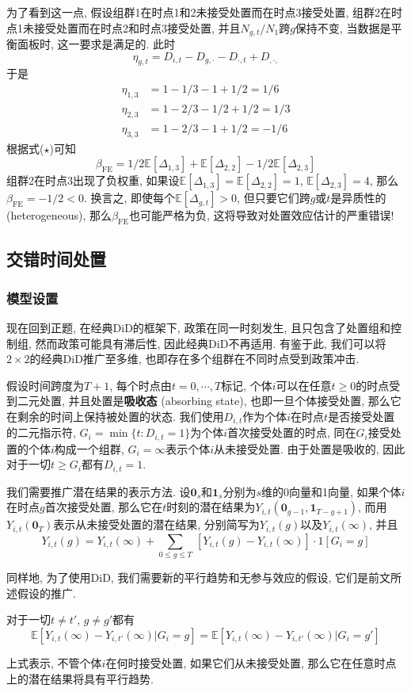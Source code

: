 \documentclass[cn,blue,14pt,screen,bibstyle=gb7714-2015]{elegantnote}
\newcommand{\E}{\mathbb{E}}
\begin{document}
为了看到这一点, 假设组群1在时点1和2未接受处置而在时点3接受处置, 组群2在时点1未接受处置而在时点2和时点3接受处置, 并且$N_{g,t}/N_1$跨$g$保持不变, 当数据是平衡面板时, 这一要求是满足的. 此时
$$\eta_{g,t}=D_{i,t}-D_{g,\cdot}-D_{\cdot,t}+D_{,\cdot,}$$
于是
\begin{align*}
\eta_{1,3}&=1-1/3-1+1/2=1/6 \\
\eta_{2,3}&=1-2/3-1/2+1/2=1/3 \\
\eta_{3,3}&=1-2/3-1+1/2=-1/6
\end{align*}
根据式($\star$)可知
$$\beta_\text{FE}=1/2\E[\Delta_{1,3}]+\E[\Delta_{2,2}]-1/2\E[\Delta_{2,3}]$$
组群2在时点3出现了负权重, 如果设$\E[\Delta_{1,3}]=\E[\Delta_{2,2}]=1$, $\E[\Delta_{2,3}]=4$, 那么$\beta_\text{FE}=-1/2<0$. 换言之, 即使每个$\E[\Delta_{g,t}]>0$, 但只要它们跨$g$或$t$是异质性的 (heterogeneous), 那么$\beta_\text{FE}$也可能严格为负, 这将导致对处置效应估计的严重错误!

\subsection{交错时间处置}
\subsubsection{模型设置}
现在回到正题, 在经典DiD的框架下, 政策在同一时刻发生, 且只包含了处置组和控制组, 然而政策可能具有滞后性, 因此经典DiD不再适用. 有鉴于此, 我们可以将$2\times2$的经典DiD推广至多维, 也即存在多个组群在不同时点受到政策冲击.

假设时间跨度为$T+1$, 每个时点由$t=0,\cdots,T$标记, 个体$i$可以在任意$t\ge0$的时点受到二元处置, 并且处置是\textbf{吸收态} (absorbing state), 也即一旦个体接受处置, 那么它在剩余的时间上保持被处置的状态. 我们使用$D_{i,t}$作为个体$i$在时点$t$是否接受处置的二元指示符, $G_i=\min\{t:D_{i,t}=1\}$为个体$i$首次接受处置的时点, 同在$G_i$接受处置的个体$i$构成一个组群, $G_i=\infty$表示个体$i$从未接受处置. 由于处置是吸收的, 因此对于一切$t\ge G_i$都有$D_{i,t}=1$.

我们需要推广潜在结果的表示方法. 设$\mathbf{0}_s$和$\mathbf{1}_s$分别为$s$维的0向量和1向量, 如果个体$i$在时点$g$首次接受处置, 那么它在$t$时刻的潜在结果为$Y_{i,t}(\mathbf{0}_{g-1},\mathbf{1}_{T-g+1})$, 而用$Y_{i,t}(\mathbf{0}_T)$表示从未接受处置的潜在结果, 分别简写为$Y_{i,t}(g)$以及$Y_{i,t}(\infty)$, 并且
$$Y_{i,t}(g)=Y_{i,t}(\infty)+\sum_{0\leq g\leq T}\,[Y_{i,t}(g)-Y_{i,t}(\infty)]\cdot 1[G_i=g]$$

同样地, 为了使用DiD, 我们需要新的平行趋势和无参与效应的假设, 它们是前文所述假设的推广.
\begin{definition}[平行趋势]
对于一切$t\neq t'$, $g\neq g'$都有
$$\E[Y_{i,t}(\infty)-Y_{i,t'}(\infty)|G_i=g]=\E[Y_{i,t}(\infty)-Y_{i,t'}(\infty)|G_i=g']$$
\end{definition}
上式表示, 不管个体$i$在何时接受处置, 如果它们从未接受处置, 那么它在任意时点上的潜在结果将具有平行趋势.
\end{document}
